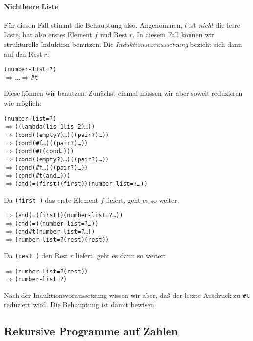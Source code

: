 \paragraph{Nichtleere Liste}
Für diesen Fall stimmt die Behauptung also.  Angenommen, $l$ ist
\emph{nicht} die leere Liste, hat also erstes Element $f$ und Rest
$r$.  In diesem Fall können wir strukturelle Induktion benutzen.  Die
\emph{Induktionsvoraussetzung} bezieht sich dann auf den Rest $r$:
%
\begin{alltt}
(number-list=?  )
\(\Longrightarrow\ldots\Longrightarrow\) #t
\end{alltt}
%
Diese können wir benutzen.  Zunächst einmal müssen wir aber soweit
reduzieren wie möglich:
%
\begin{alltt}
(number-list=?  )
\(\Longrightarrow\) ((lambda (lis-1 lis-2) \ldots{})  )
\(\Longrightarrow\) (cond ((empty? ) \ldots) ((pair? ) \ldots))
\(\Longrightarrow\) (cond (#f \ldots) ((pair? ) \ldots))
\(\Longrightarrow\) (cond (#t (cond \ldots)))
\(\Longrightarrow\) (cond ((empty? ) \ldots) ((pair? ) \ldots))
\(\Longrightarrow\) (cond (#f \ldots) ((pair? ) \ldots))
\(\Longrightarrow\) (cond (#t (and \ldots)))
\(\Longrightarrow\) (and (= (first ) (first )) (number-list=? \ldots))
\end{alltt}
%
Da \texttt{(first )} das erste Element $f$ liefert, geht es
so weiter:
\begin{alltt}
\(\Longrightarrow\) (and (=  (first )) (number-list=? \ldots))
\(\Longrightarrow\) (and (=  ) (number-list=? \ldots))
\(\Longrightarrow\) (and #t (number-list=? \ldots))
\(\Longrightarrow\) (number-list=? (rest ) (rest ))
\end{alltt}
%
Da \texttt{(rest )} den Rest $r$ liefert, geht es dann so
weiter:
%
\begin{alltt}
\(\Longrightarrow\) (number-list=?  (rest ))
\(\Longrightarrow\) (number-list=?  )
\end{alltt}
%
Nach der Induktionsvoraussetzung wissen wir aber, daß der letzte
Ausdruck zu \verb|#t| reduziert wird.  Die Behauptung ist damit
bewisen.


\subsection{Rekursive Programme auf Zahlen}

